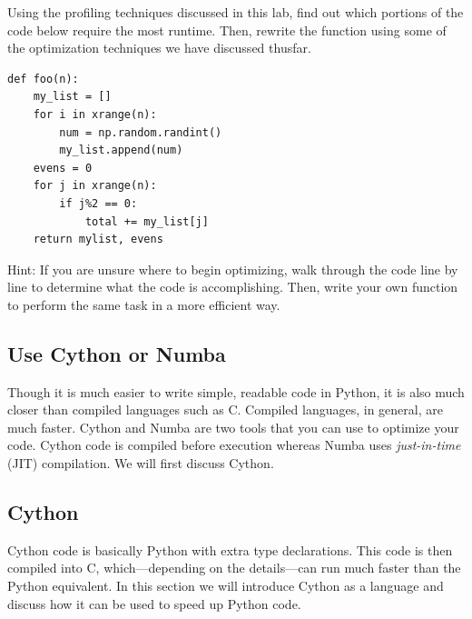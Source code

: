 \begin{problem}
Using the profiling techniques discussed in this lab, find out which portions of the code below require the most runtime. Then, rewrite the function using some of the optimization techniques we have discussed thusfar.
\begin{lstlisting}
def foo(n):
    my_list = []
    for i in xrange(n):
        num = np.random.randint()
        my_list.append(num)
    evens = 0
    for j in xrange(n):
        if j%2 == 0:
            total += my_list[j]
    return mylist, evens
\end{lstlisting}

Hint: If you are unsure where to begin optimizing, walk through the code line by line to determine what the code is accomplishing. Then, write your own function to perform the same task in a more efficient way.
\end{problem}


\subsection*{Use Cython or Numba}
Though it is much easier to write simple, readable code in Python, it is also much closer than compiled languages such as C. Compiled languages, in general, are much faster.
Cython and Numba are two tools that you can use to optimize your code. Cython code is compiled before execution whereas Numba uses \emph{just-in-time} (JIT) compilation. We will first discuss Cython.

\subsection*{Cython}
Cython code is basically Python with extra type declarations.
This code is then compiled into C, which---depending on the details---can run much faster than the Python equivalent.
In this section we will introduce Cython as a language and discuss how it can be used to speed up Python code.

